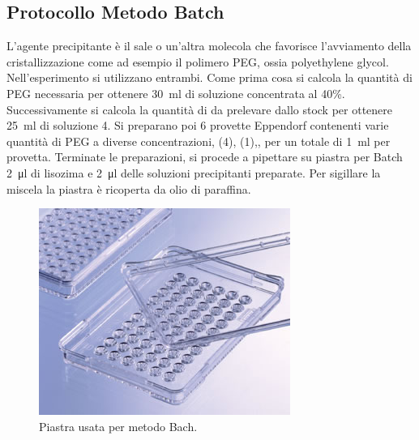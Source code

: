 \documentclass[twocolumn,a4paper,10pt]{my_report}
\begin{document}
{\subsection*{Protocollo Metodo Batch}
L'agente precipitante è il sale o un'altra molecola che favorisce l'avviamento della cristallizzazione come ad esempio il polimero PEG, ossia polyethylene glycol.
Nell'esperimento si utilizzano entrambi.
Come prima cosa si calcola la quantità di PEG necessaria per ottenere \SI{30}{\ml} di soluzione concentrata al 40\%.
Successivamente si calcola la quantità di  da prelevare dallo stock per ottenere \SI{25}{\ml} di soluzione \SI{4}{\Molar}.
Si preparano poi 6 provette Eppendorf contenenti varie quantità di PEG a diverse concentrazioni, (\SI{4}{\Molar}),  (\SI{1}{\Molar}),, per un totale di \SI{1}{\ml} per provetta.
Terminate le preparazioni, si procede a pipettare su piastra per Batch \SI{2}{\ul} di lisozima e \SI{2}{\ul} delle soluzioni precipitanti preparate.
Per sigillare la miscela la piastra è ricoperta da olio di paraffina.
\begin{figure}[htbp]
\centering
\includegraphics[width=0.8\linewidth]{microbatch.jpg}
\caption{Piastra usata per metodo Bach.}
\label{fig:fig12}
\end{figure}

}
\end{document}
